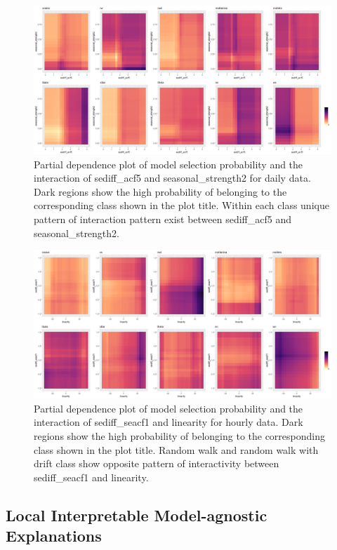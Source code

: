 \documentclass[11pt,a4paper,]{article}
\begin{document}
\begin{figure}
\centering
\includegraphics{figures/dtwopdp-1.png}
\caption{\label{fig:dtwopdp}Partial dependence plot of model selection
probability and the interaction of sediff\_acf5 and seasonal\_strength2
for daily data. Dark regions show the high probability of belonging to
the corresponding class shown in the plot title. Within each class
unique pattern of interaction pattern exist between sediff\_acf5 and
seasonal\_strength2.}
\end{figure}

\begin{figure}
\centering
\includegraphics{figures/htwopdp-1.png}
\caption{\label{fig:htwopdp}Partial dependence plot of model selection
probability and the interaction of sediff\_seacf1 and linearity for
hourly data. Dark regions show the high probability of belonging to the
corresponding class shown in the plot title. Random walk and random walk
with drift class show opposite pattern of interactivity between
sediff\_seacf1 and linearity.}
\end{figure}

\clearpage

\subsection{Local Interpretable Model-agnostic
Explanations}\label{local-interpretable-model-agnostic-explanations}
\end{document}
